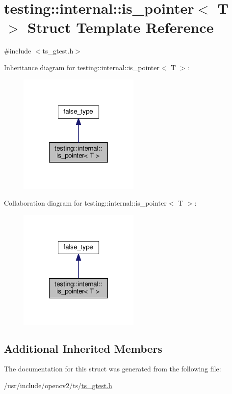 \hypertarget{structtesting_1_1internal_1_1is__pointer}{\section{testing\-:\-:internal\-:\-:is\-\_\-pointer$<$ T $>$ Struct Template Reference}
\label{structtesting_1_1internal_1_1is__pointer}
}


{\ttfamily \#include $<$ts\-\_\-gtest.\-h$>$}



Inheritance diagram for testing\-:\-:internal\-:\-:is\-\_\-pointer$<$ T $>$\-:\nopagebreak
\begin{figure}[H]
\begin{center}
\leavevmode
\includegraphics[width=168pt]{structtesting_1_1internal_1_1is__pointer__inherit__graph}
\end{center}
\end{figure}


Collaboration diagram for testing\-:\-:internal\-:\-:is\-\_\-pointer$<$ T $>$\-:\nopagebreak
\begin{figure}[H]
\begin{center}
\leavevmode
\includegraphics[width=168pt]{structtesting_1_1internal_1_1is__pointer__coll__graph}
\end{center}
\end{figure}
\subsection*{Additional Inherited Members}


The documentation for this struct was generated from the following file\-:\begin{DoxyCompactItemize}
\item 
/usr/include/opencv2/ts/\hyperlink{ts__gtest_8h}{ts\-\_\-gtest.\-h}\end{DoxyCompactItemize}
